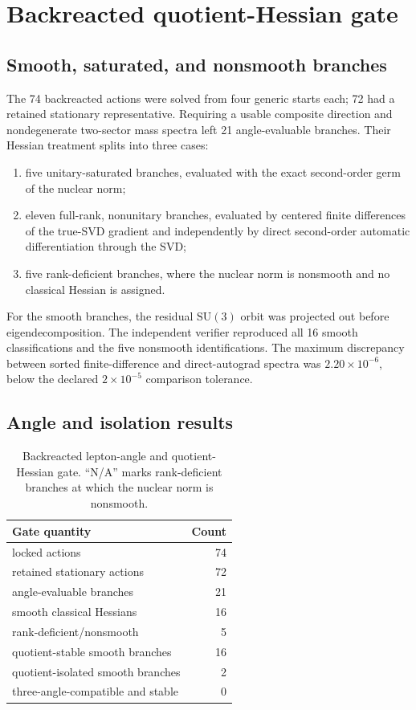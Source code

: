 \documentclass[11pt]{article}
\newcommand{\SU}{\mathrm{SU}}
\begin{document}
\section{Backreacted quotient-Hessian gate}
\label{sec:backreacted-results}

\subsection{Smooth, saturated, and nonsmooth branches}

The 74 backreacted actions were solved from four generic starts each; 72 had a retained stationary representative.  Requiring a usable composite direction and nondegenerate two-sector mass spectra left 21 angle-evaluable branches.  Their Hessian treatment splits into three cases:
\begin{enumerate}[leftmargin=2.1em]
  \item five unitary-saturated branches, evaluated with the exact second-order germ of the nuclear norm;
  \item eleven full-rank, nonunitary branches, evaluated by centered finite differences of the true-SVD gradient and independently by direct second-order automatic differentiation through the SVD;
  \item five rank-deficient branches, where the nuclear norm is nonsmooth and no classical Hessian is assigned.
\end{enumerate}
For the smooth branches, the residual $\SU(3)$ orbit was projected out before eigendecomposition.  The independent verifier reproduced all 16 smooth classifications and the five nonsmooth identifications.  The maximum discrepancy between sorted finite-difference and direct-autograd spectra was $2.20\times10^{-6}$, below the declared $2\times10^{-5}$ comparison tolerance.

\subsection{Angle and isolation results}

\begin{table}[t]
\centering
\caption{Backreacted lepton-angle and quotient-Hessian gate.  ``N/A'' marks rank-deficient branches at which the nuclear norm is nonsmooth.}
\label{tab:link-counts}
\begin{tabular}{@{}lr@{}}
\toprule
Gate quantity & Count \\
\midrule
locked actions & 74 \\
retained stationary actions & 72 \\
angle-evaluable branches & 21 \\
smooth classical Hessians & 16 \\
rank-deficient/nonsmooth & 5 \\
quotient-stable smooth branches & 16 \\
quotient-isolated smooth branches & 2 \\
three-angle-compatible and stable & 0 \\
\bottomrule
\end{tabular}
\end{table}
\end{document}
